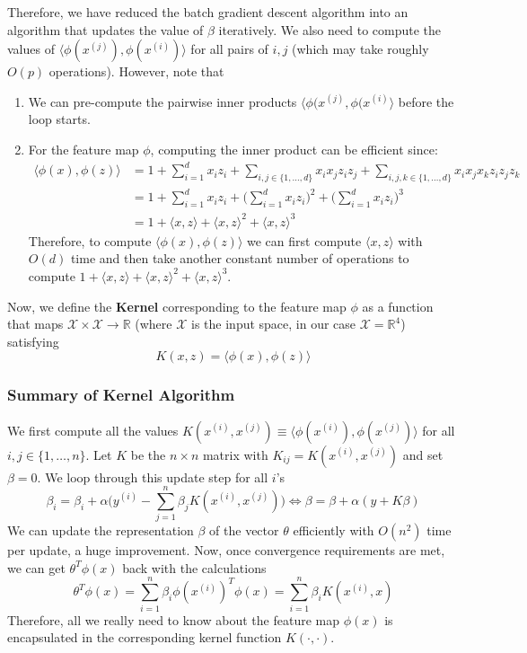 \documentclass[a4paper, 12pt]{report}
\theoremstyle{remark}
\theoremstyle{definition}
\begin{document}
Therefore, we have reduced the batch gradient descent algorithm into an algorithm that updates the value of $\beta$ iteratively. We also need to compute the values of $\langle \phi(x^{(j)}), \phi(x^{(i)}) \rangle$ for all pairs of $i, j$ (which may take roughly $O(p)$ operations). However, note that
\begin{enumerate}
    \item We can pre-compute the pairwise inner products $\langle \phi(x^{(j)}, \phi(x^{(i)} \rangle$ before the loop starts. 
    \item For the feature map $\phi$, computing the inner product can be efficient since: 
    \begin{align*}
        \langle \phi(x), \phi(z)\rangle & = 1 + \sum_{i=1}^d x_i z_i + \sum_{i, j \in \{1, \ldots, d\}} x_i x_j z_i z_j + \sum_{i, j, k \in \{1, \ldots, d\}} x_i x_j x_k z_i z_j z_k \\
        & = 1 + \sum_{i=1}^d  x_i z_i + \bigg( \sum_{i=1}^d x_i z_i \bigg)^2 + \bigg(\sum_{i=1}^d x_i z_i \bigg)^3 \\
        & = 1 + \langle x, z \rangle + \langle x, z \rangle^2 + \langle x, z \rangle^3 
    \end{align*}
    Therefore, to compute $\langle \phi(x), \phi(z) \rangle$ we can first compute $\langle x, z \rangle$ with $O(d)$ time and then take another constant number of operations to compute $1 + \langle x, z \rangle + \langle x, z \rangle^2 + \langle x, z \rangle^3$. 
\end{enumerate}

Now, we define the \textbf{Kernel} corresponding to the feature map $\phi$ as a function that maps $\mathcal{X} \times \mathcal{X} \longrightarrow \mathbb{R}$ (where $\mathcal{X}$ is the input space, in our case $\mathcal{X} = \mathbb{R}^4$) satisfying
\[K(x, z) = \langle \phi(x), \phi(z) \rangle\]

\subsubsection{Summary of Kernel Algorithm}
We first compute all the values $K(x^{(i)}, x^{(j)}) \equiv \langle \phi(x^{(i)}), \phi(x^{(j)}) \rangle$ for all $i, j \in \{1, \ldots, n\}$. Let $K$ be the $n\times n$ matrix with $K_{ij} = K(x^{(i)}, x^{(j)})$ and set $\beta = 0$. We loop through this update step for all $i$'s
\[\beta_i = \beta_i + \alpha \bigg( y^{(i)} - \sum_{j=1}^n \beta_j K(x^{(i)}, x^{(j)}) \bigg) \iff \beta = \beta + \alpha (y + K \beta)\]
We can update the representation $\beta$ of the vector $\theta$ efficiently with $O(n^2)$ time per update, a huge improvement. Now, once convergence requirements are met, we can get $\theta^T \phi(x)$ back with the calculations
\[\theta^T \phi(x) = \sum_{i=1}^n \beta_i \phi(x^{(i)})^T \phi(x) = \sum_{i=1}^n \beta_i K(x^{(i)}, x)\]
Therefore, all we really need to know about the feature map $\phi(x)$ is encapsulated in the corresponding kernel function $K(\cdot, \cdot)$. 
\end{document}
